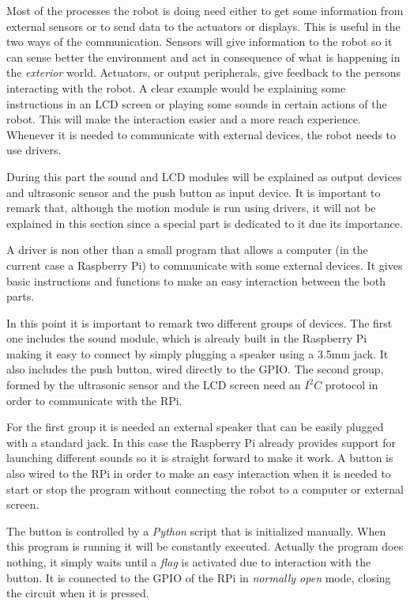Most of the processes the robot is doing need either to get some information from external sensors or to send data to the actuators or displays. This is useful in the two ways of the communication. Sensors will give information to the robot so it can sense better the environment and act in consequence of what is happening in the \textit{exterior} world. Actuators, or output peripherals, give feedback to the persons interacting with the robot. A clear example would be explaining some instructions in an LCD screen or playing some sounds in certain actions of the robot. This will make the interaction easier and a more reach experience. Whenever it is needed to communicate with external devices, the robot needs to use drivers.

During this part the sound and LCD modules will be explained as output devices and ultrasonic sensor and the push button as input device. It is important to remark that, although the motion module is run using drivers, it will not be explained in this section since a special part is dedicated to it due its importance.

A driver is non other than a small program that allows a computer (in the current case a Raspberry Pi) to communicate with some external devices. It gives basic instructions and functions to make an easy interaction between the both parts.

In this point it is important to remark two different groups of devices. The first one includes the sound module, which is already built in the Raspberry Pi making it easy to connect by simply plugging a speaker using a 3.5mm jack. It also includes the push button, wired directly to the GPIO. The second group, formed by the ultrasonic sensor and the LCD screen need an $I^{2}C$ protocol in order to communicate with the RPi.

For the first group it is needed an external speaker that can be easily plugged with a standard jack. In this case the Raspberry Pi already provides support for launching different sounds so it is straight forward to make it work. A button is also wired to the RPi in order to make an easy interaction when it is needed to start or stop the program without connecting the robot to a computer or external screen. 

The button is controlled by a \textit{Python} script that is initialized manually. When this program is running it will be constantly executed. Actually the program does nothing, it simply waits until a \textit{flag} is activated due to interaction with the button. It is connected to the GPIO of the RPi in \textit{normally open} mode, closing the circuit when it is pressed.

